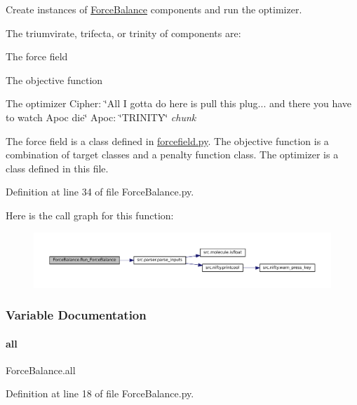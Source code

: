 Create instances of \hyperlink{namespaceForceBalance}{Force\+Balance} components and run the optimizer. 

The triumvirate, trifecta, or trinity of components are\+:
\begin{DoxyItemize}
\item The force field
\item The objective function
\item The optimizer Cipher\+: \char`\"{}\+All I gotta do here is pull this plug... and there you have to watch Apoc die\char`\"{} Apoc\+: \char`\"{}\+T\+R\+I\+N\+I\+T\+Y\char`\"{} {\itshape chunk}
\end{DoxyItemize}

The force field is a class defined in \hyperlink{forcefield_8py}{forcefield.\+py}. The objective function is a combination of target classes and a penalty function class. The optimizer is a class defined in this file. 

Definition at line 34 of file Force\+Balance.\+py.

Here is the call graph for this function\+:
\nopagebreak
\begin{figure}[H]
\begin{center}
\leavevmode
\includegraphics[width=350pt]{namespaceForceBalance_ab2b0185becf32b01adf8af885ad10345_cgraph}
\end{center}
\end{figure}


\subsubsection{Variable Documentation}
\mbox{\label{namespaceForceBalance_ade5c4134470535272ce69775da10bcc3}} 
\paragraph{\texorpdfstring{all}{all}}
{\footnotesize\ttfamily Force\+Balance.\+all}



Definition at line 18 of file Force\+Balance.\+py.

